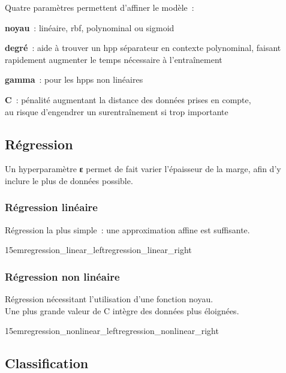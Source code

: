 Quatre paramètres permettent d’affiner le modèle :
\begin{itmz}
\item{\textbf{noyau} : linéaire, \gls{rbf}, polynominal ou \gls{sigmoid}}
\item{\textbf{degré} : aide à trouver un \gls{hpp} séparateur en contexte polynominal,
faisant rapidement augmenter le temps nécessaire à l’entraînement}
\item{\textbf{gamma} : pour les \glspl{hpp} non linéaires}
\item{\textbf{C} : pénalité augmentant la distance des données prises en compte,\\
au risque d’engendrer un surentraînement si trop importante}
\end{itmz}

\pagebreak

\subsection{Régression}

Un hyperparamètre \textbf{ε} permet de fait varier l’épaisseur de la marge,
afin d’y inclure le plus de données possible.

\subsubsection{Régression linéaire}

Régression la plus simple : une approximation affine est suffisante.

{15em}{regression_linear_left}{regression_linear_right}

\subsubsection{Régression non linéaire}

Régression nécessitant l’utilisation d’une fonction noyau.\\
Une plus grande valeur de C intègre des données plus éloignées.

{15em}{regression_nonlinear_left}{regression_nonlinear_right}

\pagebreak

\subsection{Classification}


